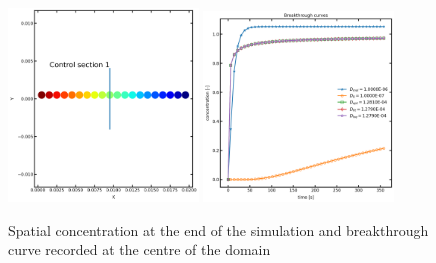 \documentclass{article}
\begin{document}
\begin{figure}[htbp!]
    \centering
    \includegraphics[width=0.45\textwidth]{images/fromOpenPNM/validationCS1.png}
    \hspace{0.05\textwidth}
    \includegraphics[width=0.45\textwidth]{images/fromOpenPNM/btcCS1.png}
    \caption{Spatial concentration at the end of the simulation and breakthrough curve recorded at the centre of the domain}
    \label{fig:Validation1}
\end{figure}
\end{document}

